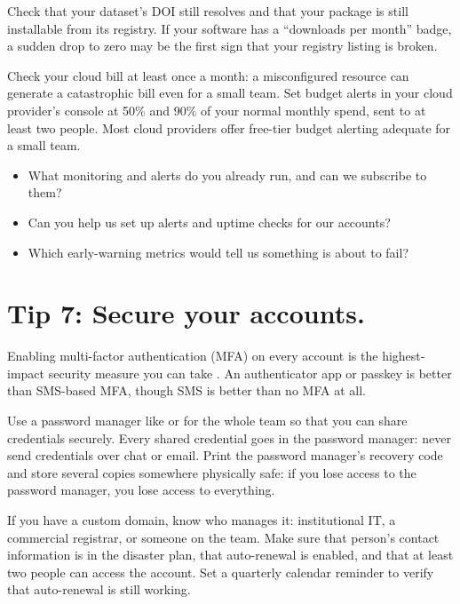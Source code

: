 \documentclass[10pt,letterpaper]{article}
\begin{document}
Check that your dataset's DOI still resolves and that your package is still
installable from its registry. If your software has a ``downloads per month''
badge, a sudden drop to zero may be the first sign that your registry listing is
broken.

Check your cloud bill at least once a month: a misconfigured resource can
generate a catastrophic bill even for a small team. Set budget alerts in your
cloud provider's console at 50\% and 90\% of your normal monthly spend, sent to
at least two people. Most cloud providers offer free-tier budget alerting
adequate for a small team.

\begin{notebox}
  \begin{itemize}
  \item What monitoring and alerts do you already run, and can we subscribe to them?
  \item Can you help us set up alerts and uptime checks for our accounts?
  \item Which early-warning metrics would tell us something is about to fail?
  \end{itemize}
\end{notebox}

\section*{Tip 7: Secure your accounts.}

Enabling multi-factor authentication (MFA) on every account is the
highest-impact security measure you can take \cite{smalls2021}. An authenticator
app or passkey is better than SMS-based MFA, though SMS is better than no MFA at
all.

Use a password manager like  or
 for the whole team so that you can
share credentials securely.  Every shared credential goes in the password
manager: never send credentials over chat or email. Print the password manager's
recovery code and store several copies somewhere physically safe: if you lose
access to the password manager, you lose access to everything.

If you have a custom domain, know who manages it: institutional IT, a commercial
registrar, or someone on the team. Make sure that person's contact information
is in the disaster plan, that auto-renewal is enabled, and that at least two
people can access the account. Set a quarterly calendar reminder to verify that
auto-renewal is still working.
\end{document}
